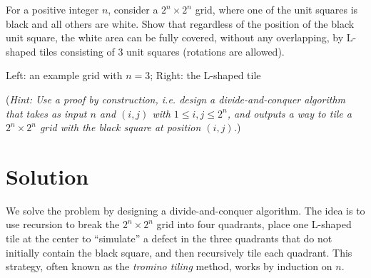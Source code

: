 \documentclass[11pt]{article}
\begin{document}
    \begin{tcolorbox}[title={Problem 3 (Grid Tiling, 35 pts)}]
        For a positive integer $n$, consider a $2^n \times 2^n$ grid, where one of the unit squares is black and all others are white. Show that regardless of the position of the black unit square, the white area can be fully covered, without any overlapping, by L-shaped tiles consisting of $3$ unit squares (rotations are allowed).
        
        \bigskip
        
        {
        \centering
        
        Left: an example grid with $n=3$; Right: the L-shaped tile
        
        }

        \bigskip
        
        (\emph{Hint: Use a proof by construction, i.e. design a divide-and-conquer algorithm that takes as input $n$ and $(i,j)$ with $1\leq i,j \leq 2^n$, and outputs a way to tile a $2^n\times 2^n$ grid with the black square at position $(i,j)$.}) 
        \medskip

             
    \end{tcolorbox}
    \section*{Solution}
    We solve the problem by designing a divide-and-conquer algorithm. The idea is to use recursion to break the \( 2^n \times 2^n \) grid into four quadrants, place one L-shaped tile at the center to “simulate” a defect in the three quadrants that do not initially contain the black square, and then recursively tile each quadrant. This strategy, often known as the \emph{tromino tiling} method, works by induction on \( n \).
    
    \bigskip
    
\end{document}
